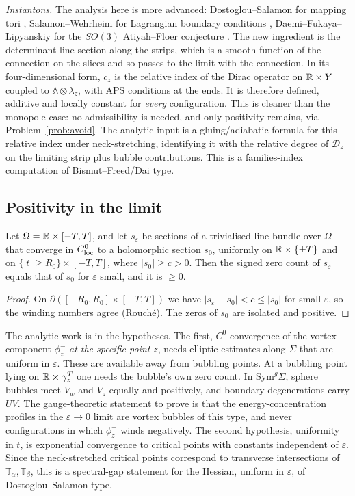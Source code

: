 \emph{Instantons.}  The analysis here is more advanced: Dostoglou--Salamon for mapping tori \cite{DoSa}, Salamon--Wehrheim for
Lagrangian boundary conditions \cite{SW-lag}, Daemi--Fukaya--Lipyanskiy for the $SO(3)$ Atiyah--Floer conjecture
\cite{DFL}.  The new ingredient is the determinant-line section along the strips, which is a smooth function of the
connection on the slices and so passes to the limit with the connection.  In its four-dimensional form, $c_z$ is the relative index of the Dirac
operator on $\mathbb{R}\times Y$ coupled to $\mathbb A\otimes\lambda_z$, with APS conditions at the ends.  It is therefore defined, additive and
locally constant for \emph{every} configuration.  This is cleaner than the monopole case: no admissibility is needed, and
only positivity remains, via Problem~\ref{prob:avoid}.  The analytic input is a gluing/adiabatic formula for this relative
index under neck-stretching, identifying it with the relative degree of $\mathcal D_z$ on the limiting strip plus bubble
contributions.  This is a families-index computation of Bismut--Freed/Dai type.

\subsection{Positivity in the limit}
\begin{lemma}\label{lem:posvortex}
Let $\Omega=\mathbb{R}\times[-T,T]$, and let $s_\varepsilon$ be sections of a trivialised line bundle over $\Omega$ that converge in $C^0_{\rm loc}$ to a
holomorphic section $s_0$, uniformly on $\mathbb{R}\times\{\pm T\}$ and on $\{|t|\ge R_0\}\times[-T,T]$, where $|s_0|\ge c>0$.  Then the
signed zero count of $s_\varepsilon$ equals that of $s_0$ for $\varepsilon$ small, and it is $\ge0$.
\end{lemma}
\begin{proof}
On $\partial([-R_0,R_0]\times[-T,T])$ we have $|s_\varepsilon-s_0|<c\le|s_0|$ for small $\varepsilon$, so the winding numbers agree (Rouché).  The
zeros of $s_0$ are isolated and positive.
\end{proof}
The analytic work is in the hypotheses.  The first, $C^0$ convergence of the vortex component $\phi^-_z$ \emph{at the
specific point} $z$, needs elliptic estimates along $\Sigma$ that are uniform in $\varepsilon$.  These are available away from
bubbling points.  At a bubbling point lying on $\mathbb{R}\times\gamma^T_z$ one needs the bubble's own zero count.  In
$\mathrm{Sym}^g\Sigma$, sphere bubbles meet $V_w$ and $V_z$ equally and positively, and boundary degenerations carry $UV$.  The
gauge-theoretic statement to prove is that the energy-concentration profiles in the $\varepsilon\to0$ limit are vortex bubbles
of this type, and never configurations in which $\phi^-_z$ winds negatively.  The second hypothesis, uniformity in
$t$, is exponential convergence to critical points with constants independent of $\varepsilon$.  Since the
neck-stretched critical points correspond to transverse intersections of $\mathbb T_\alpha,\mathbb T_\beta$, this is a spectral-gap statement
for the Hessian, uniform in $\varepsilon$, of Dostoglou--Salamon type.

